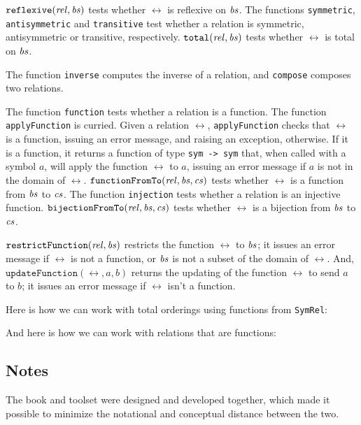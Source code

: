$\mathtt{reflexive}(\mathit{rel}, \mathit{bs})$ tests whether $\rel$ is reflexive
on $\mathit{bs}$.
The functions \texttt{symmetric}, \texttt{antisymmetric} and
\texttt{transitive} test whether a relation is symmetric, antisymmetric
or transitive, respectively.
$\mathtt{total}(\mathit{rel}, \mathit{bs})$ tests whether $\rel$ is total
on $\mathit{bs}$.

The function \texttt{inverse} computes the inverse of a relation,
and \texttt{compose} composes two relations.

The function \texttt{function} tests whether a relation is a
function.
The function \texttt{applyFunction} is curried.
%
%
%
Given a relation $\rel$, \texttt{applyFunction} checks that $\rel$ is a
function, issuing an error message, and raising an exception,
otherwise.  If it is a function, it returns a function of type
\texttt{sym -> sym} that, when called with a symbol $a$, will apply
the function $\rel$ to $a$, issuing an error message if $a$ is
not in the domain of $\rel$.
$\mathtt{functionFromTo}(\mathit{rel}, \mathit{bs}, \mathit{cs})$ tests whether $\rel$
is a function from $\mathit{bs}$ to $\mathit{cs}$.
The function \texttt{injection} tests whether a relation is
an injective function.
$\mathtt{bijectionFromTo}(\mathit{rel}, \mathit{bs}, \mathit{cs})$ tests whether $\rel$
is a bijection from $\mathit{bs}$ to $\mathit{cs}$.

$\mathtt{restrictFunction}(\mathit{rel}, \mathit{bs})$ restricts the function
$\rel$ to $\mathit{bs}$; it issues an error message if $\rel$ is not
a function, or $\mathit{bs}$ is not a subset of the domain of $\rel$.
And, $\mathtt{updateFunction}(\rel, a, b)$ returns the
updating of the function $\rel$ to send $a$ to $b$; it issues
an error message if $\rel$ isn't a function.

Here is how we can work with total orderings using functions from
\texttt{SymRel}:


And here is how we can work with relations that are functions:


\subsection{Notes}

The book and toolset were designed and developed together, which made
it possible to minimize the notational and conceptual distance between
the two.
%


